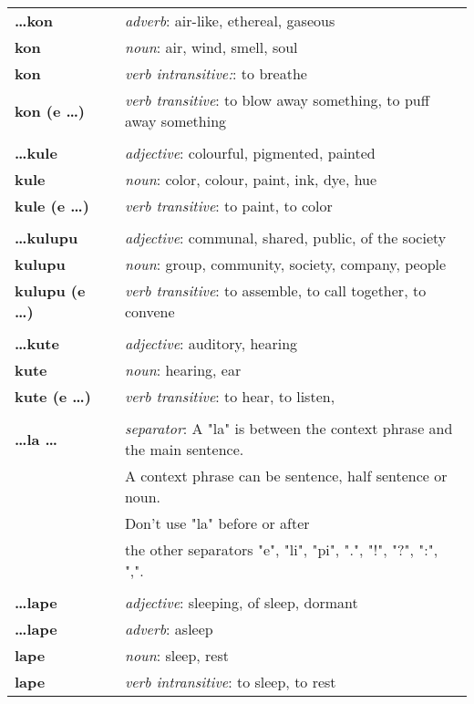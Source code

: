 \begin{supertabular}{p{2,5cm}|ll}
\textbf{\dots kon} && \textit{adverb}: air-like, ethereal, gaseous \\ 
\textbf{kon} && \textit{noun}: air, wind, smell, soul \\ 
\textbf{kon} && \textit{verb intransitive:}: to breathe \\ 
\textbf{kon (e \dots)} && \textit{verb transitive}: to blow away something, to puff away something \\ 
 && \\ %
\textbf{\dots kule} && \textit{adjective}: colourful, pigmented, painted \\ 
\textbf{kule} && \textit{noun}: color, colour, paint, ink, dye, hue \\ 
\textbf{kule (e \dots)} && \textit{verb transitive}: to paint, to color \\ 
 && \\ %
\textbf{\dots kulupu} && \textit{adjective}: communal, shared, public, of the society \\ 
\textbf{kulupu} && \textit{noun}: group, community, society, company, people \\ 
\textbf{kulupu (e \dots)} && \textit{verb transitive}: to assemble, to call together, to convene \\ 
 && \\ %
\textbf{\dots kute} && \textit{adjective}: auditory, hearing \\ 
\textbf{kute} && \textit{noun}: hearing, ear \\ 
\textbf{kute (e \dots)} && \textit{verb transitive}: to hear, to listen, \\ 
 && \\ %
\textbf{\dots la \dots} && \textit{separator}: A "la" is between the context phrase and the main sentence. \\ && A context phrase can be sentence, half sentence or noun. \\ && Don't use "la" before or after \\ && the other separators "e", "li", "pi", ".", "!", "?", ":", ",".  \\ 
 && \\ %
\textbf{\dots lape} && \textit{adjective}: sleeping, of sleep, dormant \\ 
\textbf{\dots lape} && \textit{adverb}: asleep \\ 
\textbf{lape} && \textit{noun}: sleep, rest \\ 
\textbf{lape} && \textit{verb intransitive}: to sleep, to rest \\ 

\end{supertabular}
